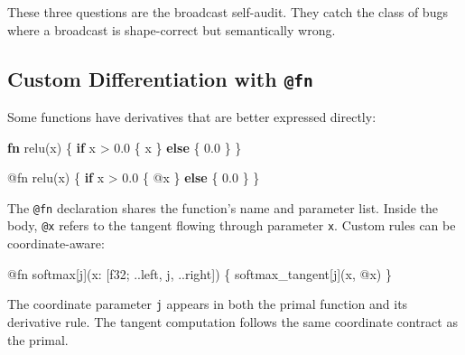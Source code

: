 \documentclass[11pt,titlepage]{article}
\newenvironment{Shaded}{}{}
\newcommand{\DataTypeTok}[1]{\textcolor[rgb]{0.56,0.13,0.00}{#1}}
\newcommand{\DecValTok}[1]{\textcolor[rgb]{0.25,0.63,0.44}{#1}}
\newcommand{\KeywordTok}[1]{\textcolor[rgb]{0.00,0.44,0.13}{\textbf{#1}}}
\newcommand{\NormalTok}[1]{#1}
\newcommand{\OperatorTok}[1]{\textcolor[rgb]{0.40,0.40,0.40}{#1}}
\begin{document}
These three questions are the broadcast self-audit. They catch the class
of bugs where a broadcast is shape-correct but semantically wrong.

\vspace{2em}

\hypertarget{custom-differentiation-with-fn}{%
\subsection{\texorpdfstring{Custom Differentiation with
\texttt{@fn}}{Custom Differentiation with @fn}}\label{custom-differentiation-with-fn}}

Some functions have derivatives that are better expressed directly:

\begin{Shaded}
\begin{Highlighting}[]
\KeywordTok{fn}\NormalTok{ relu(x) }\OperatorTok{\{} \KeywordTok{if}\NormalTok{ x > }\DecValTok{0.0} \OperatorTok{\{}\NormalTok{ x }\OperatorTok{\}} \KeywordTok{else} \OperatorTok{\{} \DecValTok{0.0} \OperatorTok{\}} \OperatorTok{\}}

\NormalTok{@fn relu(x) }\OperatorTok{\{}
    \KeywordTok{if}\NormalTok{ x > }\DecValTok{0.0} \OperatorTok{\{}\NormalTok{ @x }\OperatorTok{\}} \KeywordTok{else} \OperatorTok{\{} \DecValTok{0.0} \OperatorTok{\}}
\OperatorTok{\}}
\end{Highlighting}
\end{Shaded}

The \texttt{@fn} declaration shares the function's name and parameter
list. Inside the body, \texttt{@x} refers to the tangent flowing through
parameter \texttt{x}. Custom rules can be coordinate-aware:

\begin{Shaded}
\begin{Highlighting}[]
\NormalTok{@fn softmax}\OperatorTok{[}\NormalTok{j}\OperatorTok{]}\NormalTok{(x: }\OperatorTok{[}\DataTypeTok{f32}\NormalTok{; ..left, j, ..right}\OperatorTok{]}\NormalTok{) }\OperatorTok{\{}
\NormalTok{    softmax_tangent}\OperatorTok{[}\NormalTok{j}\OperatorTok{]}\NormalTok{(x, @x)}
\OperatorTok{\}}
\end{Highlighting}
\end{Shaded}

The coordinate parameter \texttt{j} appears in both the primal function
and its derivative rule. The tangent computation follows the same
coordinate contract as the primal.

\vspace{2em}
\end{document}
